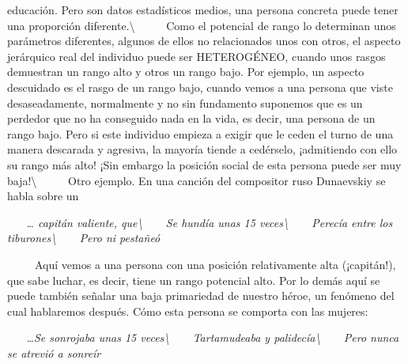 educación. Pero son datos estadísticos medios, una persona concreta
puede tener una proporción diferente.\textbackslash{} ~ ~ ~ Como el
potencial de rango lo determinan unos parámetros diferentes, algunos de
ellos no relacionados unos con otros, el aspecto jerárquico real del
individuo puede ser HETEROGÉNEO, cuando unos rasgos demuestran un rango
alto y otros un rango bajo. Por ejemplo, un aspecto descuidado es el
rasgo de un rango bajo, cuando vemos a una persona que viste
desaseadamente, normalmente y no sin fundamento suponemos que es un
perdedor que no ha conseguido nada en la vida, es decir, una persona de
un rango bajo. Pero si este individuo empieza a exigir que le ceden el
turno de una manera descarada y agresiva, la mayoría tiende a cedérselo,
¡admitiendo con ello su rango más alto! ¡Sin embargo la posición social
de esta persona puede ser muy baja!\textbackslash{} ~ ~ ~ Otro ejemplo.
En una canción del compositor ruso Dunaevskiy se habla sobre un

\emph{~ ~ \ldots{} capitán valiente, que\textbackslash{} ~ ~ Se hundía
unas 15 veces\textbackslash{} ~ ~ Perecía entre los
tiburones\textbackslash{} ~ ~ Pero ni pestañeó}

~ ~ ~ Aquí vemos a una persona con una posición relativamente alta
(¡capitán!), que sabe luchar, es decir, tiene un rango potencial alto.
Por lo demás aquí se puede también señalar una baja primariedad de
nuestro héroe, un fenómeno del cual hablaremos después. Cómo esta
persona se comporta con las mujeres:

\emph{~ ~ \ldots{}Se sonrojaba unas 15 veces\textbackslash{} ~ ~
Tartamudeaba y palidecía\textbackslash{} ~ ~ Pero nunca se atrevió a
sonreír}

